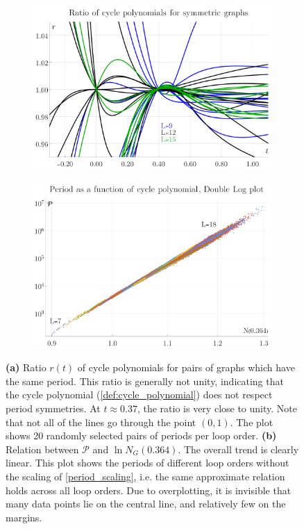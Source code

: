\documentclass[12pt]{article}
\numberwithin{equation}{section}
\newcommand{\period}{\mathcal P}
\begin{document}
\begin{figure}[htb]
	\begin{subfigure}{ .49 \linewidth}
		\centering
		\includegraphics[width=\linewidth]{figures/cycle_polynomial_ratio}
		\subcaption{}
		\label{fig:cycle_polynomial_ratio}
	\end{subfigure}
	\begin{subfigure}{ .49 \linewidth}
		\centering
		\includegraphics[width=\linewidth]{figures/cycle_polynomial_approximation}
		\subcaption{}
		\label{fig:cycle_polynomial_approximation}
	\end{subfigure}
	
	\caption{\textbf{(a)} Ratio $r(t)$ of cycle polynomials for pairs of graphs which have the same period. This ratio is generally not unity, indicating that the cycle polynomial (\cref{def:cycle_polynomial}) does not respect period symmetries. At $t\approx 0.37$, the ratio is very close to unity. Note that not all of the lines go through the point $(0,1)$. The plot shows 20 randomly selected pairs of periods per loop order. \textbf{(b)} Relation between $ \period$ and $\ln N_G(0.364)$. The overall trend is clearly linear. This plot shows the periods of different loop orders without the scaling of \cref{period_scaling}, i.e. the same approximate relation holds across all loop orders. Due to overplotting, it is invisible that many data points lie on the central line, and relatively few on the margins.  }
	
\end{figure}
\end{document}
